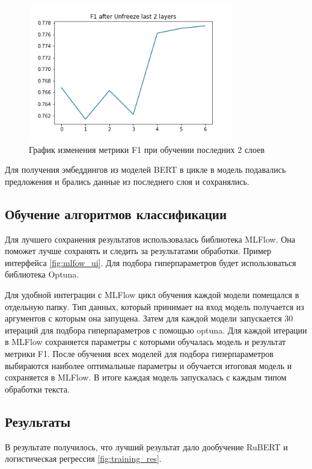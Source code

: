 \documentclass[PI, VKR]{HSEUniversity}
\begin{document}
\begin{figure}[h]
\centering
\includegraphics[width=0.8\textwidth]{img/DeepPavlovrubert-base-cased F1 Unfreeze last 2 layers.png}
\caption{\label{fig:bert_unfreeze_two_last}График изменения метрики F1 при обучении последних 2 слоев}
\end{figure}

Для получения эмбеддингов из моделей BERT в цикле в модель подавались предложения и брались данные из последнего слоя и сохранялись.
\subsection{Обучение алгоритмов классификации}
\label{sec:orgc58db8a}
Для лучшего сохранения результатов использовалась библиотека MLFlow\autocite{chen_developments_2020}. Она поможет лучше сохранять и следить за результатами обработки. Пример интерфейса \ref{fig:mlfow_ui}. Для подбора гиперпараметров будет использоваться библиотека Optuna\autocite{akiba_optuna_2019}.

Для удобной интеграции с MLFlow цикл обучения каждой модели помещался в отдельную папку. Тип данных, который принимает на вход модель получается из аргументов с которым она запущена. Затем для каждой модели запускается 30 итераций для подбора гиперпараметров с помощью optuna. Для каждой итерации в MLFlow сохраняется параметры с которыми обучалась модель и результат метрики F1. После обучения всех моделей для подбора гиперпараметров выбираются наиболее оптимальные параметры и обучается итоговая модель и сохраняется в MLFlow. В итоге каждая модель запускалась с каждым типом обработки текста.
\subsection{Результаты}
\label{sec:orga9610fb}
В результате получилось, что лучший результат дало дообучение RuBERT и логистическая регрессия \ref{fig:training_res}.
\end{document}
